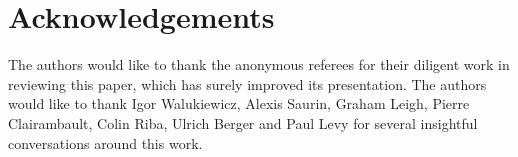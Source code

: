 \documentclass{lmcs}
\begin{document}

\section*{Acknowledgements}

The authors would like to thank the anonymous referees for their diligent work in reviewing this paper, which has surely improved its presentation.
The authors would like to thank Igor Walukiewicz, Alexis Saurin, Graham Leigh, Pierre Clairambault, Colin Riba, Ulrich Berger and Paul Levy for several insightful conversations around this work. 





\clearpage
\appendix

 
 
\end{document}
